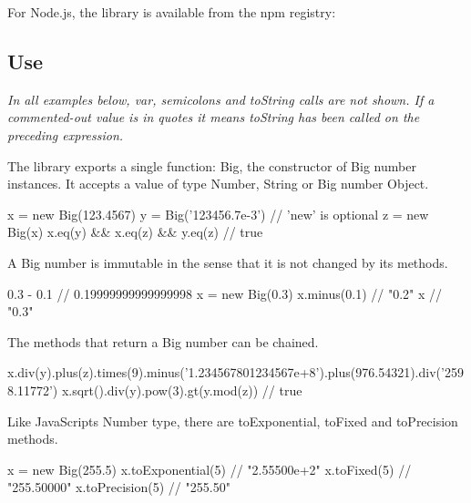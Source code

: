 For Node.\+js, the library is available from the npm registry\+: 


\subsection*{Use}

{\itshape In all examples below, {\ttfamily var}, semicolons and {\ttfamily to\+String} calls are not shown. If a commented-\/out value is in quotes it means {\ttfamily to\+String} has been called on the preceding expression.}

The library exports a single function\+: Big, the constructor of Big number instances. It accepts a value of type Number, String or Big number Object. \begin{DoxyVerb}x = new Big(123.4567)
y = Big('123456.7e-3')             // 'new' is optional
z = new Big(x)
x.eq(y) && x.eq(z) && y.eq(z)      // true
\end{DoxyVerb}


A Big number is immutable in the sense that it is not changed by its methods. \begin{DoxyVerb}0.3 - 0.1                          // 0.19999999999999998
x = new Big(0.3)
x.minus(0.1)                       // "0.2"
x                                  // "0.3"
\end{DoxyVerb}


The methods that return a Big number can be chained. \begin{DoxyVerb}x.div(y).plus(z).times(9).minus('1.234567801234567e+8').plus(976.54321).div('2598.11772')
x.sqrt().div(y).pow(3).gt(y.mod(z))    // true
\end{DoxyVerb}


Like Java\+Script\textquotesingle{}s Number type, there are {\ttfamily to\+Exponential}, {\ttfamily to\+Fixed} and {\ttfamily to\+Precision} methods. \begin{DoxyVerb}x = new Big(255.5)
x.toExponential(5)                 // "2.55500e+2"
x.toFixed(5)                       // "255.50000"
x.toPrecision(5)                   // "255.50"
\end{DoxyVerb}


